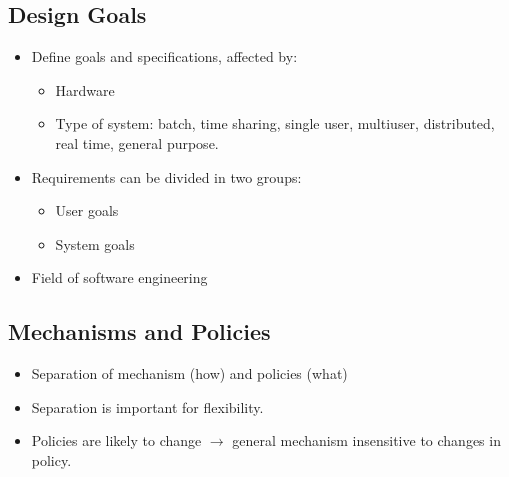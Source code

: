 \documentclass[10pt]{report}
\begin{document}
      \subsection{Design Goals}
        \begin{itemize}
          \item Define goals and specifications, affected by:
          \begin{itemize}
            \item Hardware
            \item Type of system: batch, time sharing, single user, multiuser, distributed, real time, general purpose.
          \end{itemize}
          \item Requirements can be divided in two groups:
          \begin{itemize}
            \item User goals
            \item System goals
          \end{itemize}
          \item Field of software engineering
        \end{itemize}

        \subsection{Mechanisms and Policies}
          \begin{itemize}
            \item Separation of mechanism (how) and policies (what)
            \item Separation is important for flexibility.
            \item Policies are likely to change $\rightarrow$ general mechanism insensitive to changes in policy.
          \end{itemize}
\end{document}
